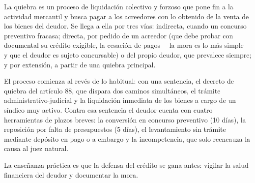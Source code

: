 \documentclass[12pt,oneside]{book}
\begin{document}
La quiebra es un proceso de liquidación colectivo y forzoso que pone fin a la actividad mercantil y busca pagar a los acreedores con lo obtenido de la venta de los bienes del deudor. Se llega a ella por tres vías: indirecta, cuando un concurso preventivo fracasa; directa, por pedido de un acreedor (que debe probar con documental su crédito exigible, la cesación de pagos ---la mora es lo más simple--- y que el deudor es sujeto concursable) o del propio deudor, que prevalece siempre; y por extensión, a partir de una quiebra principal.

El proceso comienza al revés de lo habitual: con una sentencia, el decreto de quiebra del artículo 88, que dispara dos caminos simultáneos, el trámite administrativo-judicial y la liquidación inmediata de los bienes a cargo de un síndico muy activo. Contra esa sentencia el deudor cuenta con cuatro herramientas de plazos breves: la conversión en concurso preventivo (10 días), la reposición por falta de presupuestos (5 días), el levantamiento sin trámite mediante depósito en pago o a embargo y la incompetencia, que solo reencauza la causa al juez natural.

La enseñanza práctica es que la defensa del crédito se gana antes: vigilar la salud financiera del deudor y documentar la mora.
\end{document}
